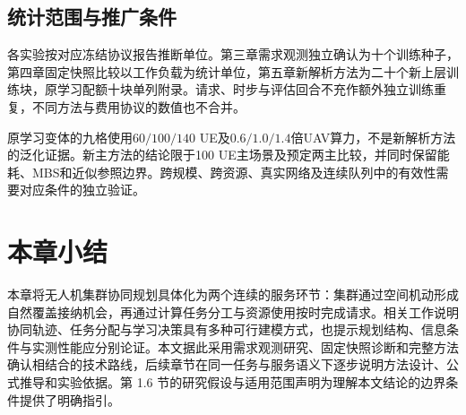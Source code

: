 \subsection{统计范围与推广条件}
\label{sec:statistical-assumptions}
\label{sec:overall-scope}
各实验按对应冻结协议报告推断单位。第三章需求观测独立确认为十个训练种子，第四章固定快照比较以工作负载为统计单位，第五章新解析方法为二十个新上层训练块，原学习配额十块单列附录。请求、时步与评估回合不充作额外独立训练重复，不同方法与费用协议的数值也不合并。

原学习变体的九格使用$60/100/140$ UE及$0.6/1.0/1.4$倍UAV算力，不是新解析方法的泛化证据。新主方法的结论限于100 UE主场景及预定两主比较，并同时保留能耗、MBS和近似参照边界。跨规模、跨资源、真实网络及连续队列中的有效性需要对应条件的独立验证。

\section{本章小结}
\label{sec:summary-chap01}

本章将无人机集群协同规划具体化为两个连续的服务环节：集群通过空间机动形成自然覆盖接纳机会，再通过计算任务分工与资源使用按时完成请求。相关工作说明协同轨迹、任务分配与学习决策具有多种可行建模方式，也提示规划结构、信息条件与实测性能应分别论证。本文据此采用需求观测研究、固定快照诊断和完整方法确认相结合的技术路线，后续章节在同一任务与服务语义下逐步说明方法设计、公式推导和实验依据。第 1.6 节的研究假设与适用范围声明为理解本文结论的边界条件提供了明确指引。
